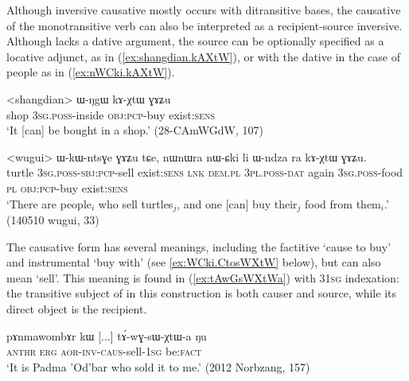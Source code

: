 Although inversive causative mostly occurs with ditransitive bases, the causative of the monotransitive verb  can also be interpreted as a recipient-source inversive. Although  lacks a dative argument, the source can be optionally specified as a locative adjunct, as in (\ref{ex:shangdian.kAXtW}), or with the dative in the case of people as in (\ref{ex:nWCki.kAXtW}).

\begin{exe}
\ex \label{ex:shangdian.kAXtW}
\gll <shangdian> ɯ-ŋgɯ kɤ-χtɯ ɣɤʑu \\
shop \textsc{3sg}.\textsc{poss}-inside \textsc{obj}:\textsc{pcp}-buy exist:\textsc{sens} \\
\glt `It [can] be bought in a shop.' (28-CAmWGdW, 107)
\end{exe}
 
 \begin{exe}
\ex \label{ex:nWCki.kAXtW}
\gll  <wugui> ɯ-kɯ-ntsɣe ɣɤʑu tɕe, nɯnɯra nɯ-ɕki li ɯ-ndza ra kɤ-χtɯ ɣɤʑu. \\
turtle \textsc{3sg}.\textsc{poss}-\textsc{sbj}:\textsc{pcp}-sell exist:\textsc{sens} \textsc{lnk} \textsc{dem}.\textsc{pl} \textsc{3pl}.\textsc{poss}-\textsc{dat} again \textsc{3sg}.\textsc{poss}-food \textsc{pl} \textsc{obj}:\textsc{pcp}-buy exist:\textsc{sens} \\
\glt `There are people$_i$ who sell turtles$_j$, and one [can] buy their$_j$ food from them$_i$.' (140510 wugui, 33)
\end{exe}

The causative form  has several meanings, including the factitive `cause to buy' and instrumental  `buy with' (see \ref{ex:WCki.CtosWXtW} below), but can also mean `sell'. This meaning is found in (\ref{ex:tAwGsWXtWa}) with 3\fl{}\textsc{1sg} indexation: the transitive subject of  in this construction is both causer and source, while its direct object is the recipient.

\begin{exe}
\ex \label{ex:tAwGsWXtWa}
\gll  pɤnmawombɤr kɯ [...] tɤ́-wɣ-sɯ-χtɯ-a ŋu \\
\textsc{anthr} \textsc{erg} { } \textsc{aor}-\textsc{inv}-\textsc{caus}-sell-\textsc{1sg} be:\textsc{fact} \\
\glt `It is Padma 'Od'bar who sold it to me.' (2012 Norbzang, 157)
\end{exe} 

